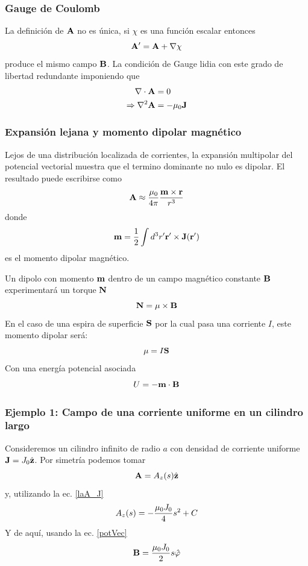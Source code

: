\documentclass[]{article}
\numberwithin{equation}{section}
\begin{document}
\subsubsection{Gauge de Coulomb}
La definición de \(\mathbf{A}\) no es única, si \(\chi\) es una función escalar entonces
\begin{equation}
	\mathbf{A}' = \mathbf{A} + \nabla\chi
\end{equation}
produce el mismo campo \(\mathbf{B}\). La condición de Gauge lidia con este grado de libertad redundante imponiendo que
\begin{align}
	\nabla\cdot\mathbf{A} &= 0\label{diA_0}\\
	\Rightarrow\nabla^2\mathbf{A} &= -\mu_{0}\mathbf{J} \label{laA_J}
\end{align}

\subsubsection{Expansión lejana y momento dipolar magnético}
Lejos de una distribución localizada de corrientes, la expansión multipolar del potencial vectorial muestra que el termino dominante no nulo es dipolar. El resultado puede escribirse como
\begin{equation}
	\mathbf{A} \approx \frac{\mu_{0}}{4\pi} \frac{\mathbf{m}\times\mathbf{r}}{r^3}
\end{equation}
donde
\begin{equation}
	\mathbf{m} = \frac{1}{2} \int d^3 r' \mathbf{r}' \times \mathbf{J}(\mathbf{r}')
\end{equation}
es el momento dipolar magnético.

Un dipolo con momento \(\mathbf{m}\) dentro de un campo magnético constante \(\mathbf{B}\) experimentará un torque \(\mathbf{N}\)
\begin{equation}
	\mathbf{N} = \mathbf{\mu} \times \mathbf{B}
\end{equation}
En el caso de una espira de superficie \(\mathbf{S}\) por la cual pasa una corriente \(I\), este momento dipolar será:
\begin{equation}
	\mathbf{\mu} = I\mathbf{S}
\end{equation}
Con una energía potencial asociada
\begin{equation}
	U = - \mathbf{m}\cdot\mathbf{B}
\end{equation}

\subsubsection{Ejemplo 1: Campo de una corriente uniforme en un cilindro largo}
Consideremos un cilindro infinito de radio \(a\) con densidad de corriente uniforme \(\mathbf{J} = J_0\hat{\mathbf{z}}\). Por simetría podemos tomar 
\begin{equation*}
	\mathbf{A} = A_z(s) \hat{\mathbf{z}}
\end{equation*}
y, utilizando la ec. \ref{laA_J}
\begin{equation*}
	A_z(s) = -\frac{\mu_{0} J_{0}}{4} s^2 + C
\end{equation*}
Y de aquí, usando la ec. \ref{potVec}
\begin{equation}
	\mathbf{B} = \frac{\mu_{0} J_{0}}{2} s\hat{\mathbf{\varphi}}
\end{equation}
\end{document}
